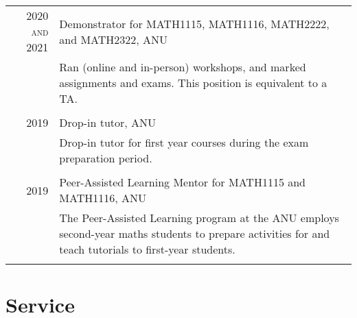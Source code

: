 \documentclass[a4paper,10pt]{article} %
\begin{document}
\begin{tabular}{r|p{12cm}}

\textsc{2020 and 2021} & Demonstrator for \textsc{MATH1115, MATH1116, MATH2222}, and \textsc{MATH2322}, ANU \emph{}\\
& \footnotesize{Ran (online and in-person) workshops, and marked assignments and exams. This position is equivalent to a TA.}\\
\multicolumn{2}{c}{} \\


\textsc{2019} & Drop-in tutor, ANU \emph{}\\
& \footnotesize{Drop-in tutor for first year courses during the exam preparation period.}\\
\multicolumn{2}{c}{} \\


\textsc{2019} & Peer-Assisted Learning Mentor for \textsc{MATH1115} and \textsc{MATH1116}, ANU \emph{}\\
& \footnotesize{The Peer-Assisted Learning program at the ANU employs second-year maths students to prepare activities for and teach tutorials to first-year students.}\\
\multicolumn{2}{c}{} \\

\end{tabular}

\section{Service}
\end{document}
